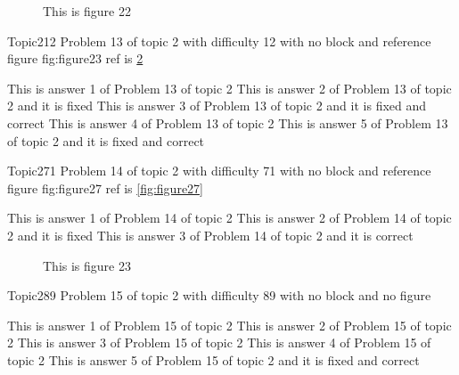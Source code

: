 \documentclass[master]{exam}
\begin{document}
\begin{figure}
	\begin{center}
		This is figure 22 
		\label{fig:figure22}
	\end{center}
\end{figure}

\begin{problem}{Topic2}{12}
	Problem 13 of topic 2 with difficulty 12 with no block and reference figure fig:figure23 ref is \ref{fig:figure23}
	\begin{answers}
		\answer This is answer 1 of Problem 13 of topic 2 
		\answer[fixed] This is answer 2 of Problem 13 of topic 2 and it is fixed
		 This is answer 3 of Problem 13 of topic 2 and it is fixed and correct
		\answer This is answer 4 of Problem 13 of topic 2 
		 This is answer 5 of Problem 13 of topic 2 and it is fixed and correct
	\end{answers}
\end{problem}

\begin{problem}{Topic2}{71}
	Problem 14 of topic 2 with difficulty 71 with no block and reference figure fig:figure27 ref is \ref{fig:figure27}
	\begin{answers}
		\answer This is answer 1 of Problem 14 of topic 2 
		\answer[fixed] This is answer 2 of Problem 14 of topic 2 and it is fixed
		\answer[correct] This is answer 3 of Problem 14 of topic 2 and it is correct
	\end{answers}
\end{problem}



\begin{figure}
	\begin{center}
		This is figure 23 
		\label{fig:figure23}
	\end{center}
\end{figure}

\begin{problem}{Topic2}{89}
	Problem 15 of topic 2 with difficulty 89 with no block and no figure
	\begin{answers}
		\answer This is answer 1 of Problem 15 of topic 2 
		\answer This is answer 2 of Problem 15 of topic 2 
		\answer This is answer 3 of Problem 15 of topic 2 
		\answer This is answer 4 of Problem 15 of topic 2 
		 This is answer 5 of Problem 15 of topic 2 and it is fixed and correct
	\end{answers}
\end{problem}
\end{document}
